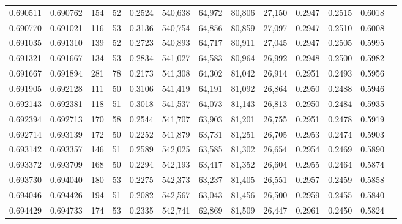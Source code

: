 \begin{tabular}{rrrrrrrrrrrrr}
0.690511 & 0.690762 &    154 &    52 &                                     0.2524 & 540,638 &  64,972 &  80,806 &  27,150 & 0.2947 & 0.2515 & 0.6018 \\
0.690770 & 0.691021 &    116 &    53 &                                     0.3136 & 540,754 &  64,856 &  80,859 &  27,097 & 0.2947 & 0.2510 & 0.6008 \\
0.691035 & 0.691310 &    139 &    52 &                                     0.2723 & 540,893 &  64,717 &  80,911 &  27,045 & 0.2947 & 0.2505 & 0.5995 \\
0.691321 & 0.691667 &    134 &    53 &                                     0.2834 & 541,027 &  64,583 &  80,964 &  26,992 & 0.2948 & 0.2500 & 0.5982 \\
0.691667 & 0.691894 &    281 &    78 &                                     0.2173 & 541,308 &  64,302 &  81,042 &  26,914 & 0.2951 & 0.2493 & 0.5956 \\
0.691905 & 0.692128 &    111 &    50 &                                     0.3106 & 541,419 &  64,191 &  81,092 &  26,864 & 0.2950 & 0.2488 & 0.5946 \\
0.692143 & 0.692381 &    118 &    51 &                                     0.3018 & 541,537 &  64,073 &  81,143 &  26,813 & 0.2950 & 0.2484 & 0.5935 \\
0.692394 & 0.692713 &    170 &    58 &                                     0.2544 & 541,707 &  63,903 &  81,201 &  26,755 & 0.2951 & 0.2478 & 0.5919 \\
0.692714 & 0.693139 &    172 &    50 &                                     0.2252 & 541,879 &  63,731 &  81,251 &  26,705 & 0.2953 & 0.2474 & 0.5903 \\
0.693142 & 0.693357 &    146 &    51 &                                     0.2589 & 542,025 &  63,585 &  81,302 &  26,654 & 0.2954 & 0.2469 & 0.5890 \\
0.693372 & 0.693709 &    168 &    50 &                                     0.2294 & 542,193 &  63,417 &  81,352 &  26,604 & 0.2955 & 0.2464 & 0.5874 \\
0.693730 & 0.694040 &    180 &    53 &                                     0.2275 & 542,373 &  63,237 &  81,405 &  26,551 & 0.2957 & 0.2459 & 0.5858 \\
0.694046 & 0.694426 &    194 &    51 &                                     0.2082 & 542,567 &  63,043 &  81,456 &  26,500 & 0.2959 & 0.2455 & 0.5840 \\
0.694429 & 0.694733 &    174 &    53 &                                     0.2335 & 542,741 &  62,869 &  81,509 &  26,447 & 0.2961 & 0.2450 & 0.5824 \\

\end{tabular}
